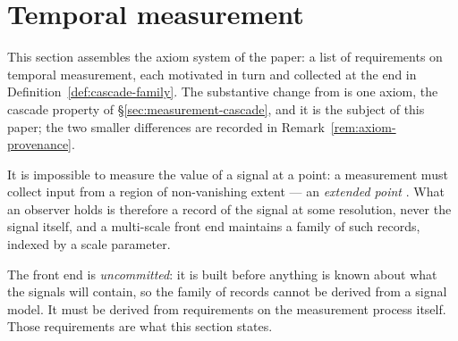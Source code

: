 %

\section{Temporal measurement}\label{sec:measurement}

This section assembles the axiom system of the paper: a list of requirements on temporal
measurement, each motivated in turn and collected at the end in
Definition~\ref{def:cascade-family}. The substantive change from
 is one axiom, the cascade property of
\S\ref{sec:measurement-cascade}, and it is the subject of this paper; the two smaller
differences are recorded in Remark~\ref{rem:axiom-provenance}.

It is impossible to measure the value of a signal at a point: a measurement must collect
input from a region of non-vanishing extent --- an \emph{extended point}
.
What an observer holds is therefore a record of the signal at some resolution, never the
signal itself, and a multi-scale front end maintains a family of such records, indexed by
a scale parameter.

The front end is \emph{uncommitted}: it is built before anything is known about what the
signals will contain, so the family of records cannot be derived from a signal model. It
must be derived from requirements on the measurement process itself. Those requirements
are what this section states.

